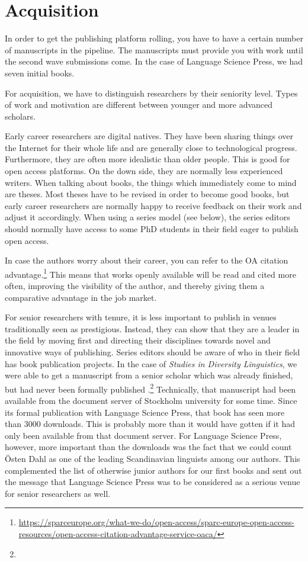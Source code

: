 \documentclass[nonflat,modfonts,output=book] {langsci/langscibook}
\begin{document}
\section{Acquisition}\label{sec:acquisition}
In order to get the publishing platform rolling, you have to have a certain number of manuscripts in the pipeline. The manuscripts must provide you with work until the second wave submissions come. In the case of Language Science Press, we had seven  initial books. 

For acquisition, we have to distinguish researchers by their seniority level. Types of work and motivation are different between younger and more advanced scholars.

Early career researchers are digital natives. They have been sharing things over the Internet for their whole life and are generally close to technological progress. Furthermore, they are often more idealistic than older people. This is good for open access platforms. On the down side, they are normally less experienced writers. When talking about books, the things which immediately come to mind are theses. Most theses have to be revised in order to become good books, but early career researchers are normally happy to receive feedback on their work and adjust it accordingly. When using a series model (see below), the series editors should normally have access to some PhD students in their field eager to publish open access. 

In case the authors worry about their career, you can refer to the OA citation advantage.\footnote{\url{https://sparceurope.org/what-we-do/open-access/sparc-europe-open-access-resources/open-access-citation-advantage-service-oaca/}} This means that works openly available will be read and cited more often, improving the visibility of the author, and thereby giving them a comparative advantage in the job market.

For senior researchers with tenure, it is less important to publish in venues traditionally seen as prestigious. Instead, they can show that they are a leader in the field by moving first and directing their disciplines towards novel and innovative ways of publishing. 
Series editors should be aware of who in their field has book publication projects. In the case of \textit{Studies in Diversity Linguistics}, we were able to get a manuscript from a senior scholar which was already finished, but had never been formally published \citep{Dahl2016}.\footnote{} Technically, that manuscript had been available from the document server of Stockholm university for some time. Since its formal publication with Language Science Press, that book has seen more than 3000 downloads. This is probably more than it would have gotten if it had only been available from that document server. For Language Science Press, however, more important than the downloads  was the fact that we could count Östen Dahl as one of the leading Scandinavian linguists among our authors. This complemented the list of otherwise junior authors for our first books and sent out the message that Language Science Press was to be considered as a serious venue for senior researchers as well. 
\end{document}

